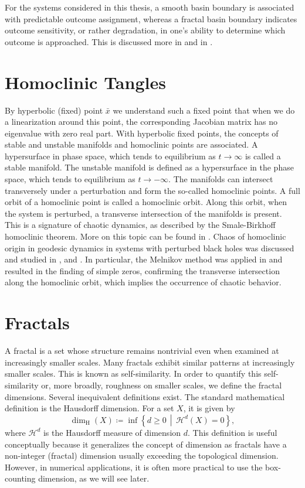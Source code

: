 For the systems considered in this thesis, a smooth basin boundary is associated
with predictable outcome assignment, whereas a fractal basin boundary indicates
outcome sensitivity, or rather degradation, in one's ability to determine which outcome is approached. This is discussed more in \cite{Grebogi1983} and in \cite{Ott2002}.

\section{Homoclinic Tangles}
\label{sec:homoclinic-tangles}

By hyperbolic (fixed) point $\bar{x}$ we understand such a fixed point that when we do a linearization around this point, the corresponding Jacobian matrix has no eigenvalue with zero real part. With hyperbolic fixed points, the concepts of stable and unstable manifolds and homoclinic points are associated. A hypersurface in phase space, which tends to equilibrium as $t \rightarrow \infty$ is called a stable manifold. The unstable manifold is defined as a hypersurface in the phase space, which tends to equilibrium as $t \rightarrow -\infty$.
The manifolds can intersect transversely under a perturbation and form the so-called homoclinic points. A full orbit of a homoclinic point is called a homoclinic orbit. Along this orbit, when the system is perturbed, a transverse intersection of the manifolds is present. This is a signature of chaotic dynamics, as described by the Smale-Birkhoff homoclinic theorem. More on this topic can be found in \cite{Wiggins2003}.
Chaos of homoclinic origin in geodesic dynamics in systems with perturbed black holes was discussed and studied in \cite{PolcarSemerak2019}, \cite{PolcarThesis2018} and \cite{Witzany2015}. In particular, the Melnikov method was applied in \cite{PolcarSemerak2019} and resulted in the finding of simple zeros, confirming the transverse intersection along the homoclinic orbit, which implies the occurrence of chaotic behavior.

\section{Fractals}
A fractal is a set whose structure remains nontrivial even when examined at
increasingly smaller scales. Many fractals exhibit similar patterns at increasingly smaller scales. This is known as self-similarity. In order to quantify this self-similarity or, more broadly, roughness on smaller scales, we define the fractal dimensions. Several inequivalent definitions exist. The standard
mathematical definition is the Hausdorff dimension. For a set \(X\), it is given
by
\[
\dim_{\mathrm H}(X)
\coloneqq
\inf\left\{
d \geq 0 \,\middle|\, \mathcal{H}^{d}(X)=0
\right\},
\]
where \(\mathcal{H}^{d}\) is the Hausdorff measure of dimension \(d\). This
definition is useful conceptually because it generalizes the concept of
dimension as fractals have a non-integer (fractal) dimension usually exceeding the topological dimension. However, in numerical applications, it is often
more practical to use the box-counting dimension, as we will see later.

